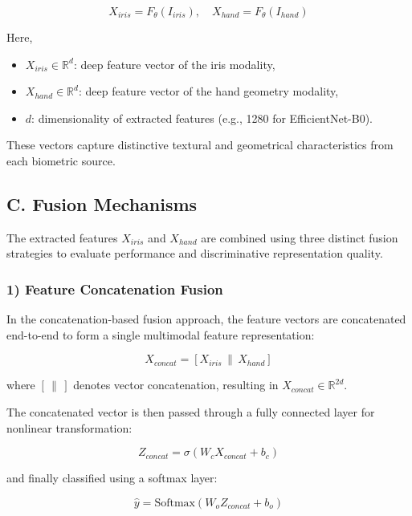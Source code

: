 \documentclass[12pt,a4paper]{report}
\begin{document}
\begin{equation}
X_{iris} = F_{\theta}(I_{iris}), \quad X_{hand} = F_{\theta}(I_{hand})
\end{equation}

Here,
\begin{itemize}
    \item \( X_{iris} \in \mathbb{R}^{d} \): deep feature vector of the iris modality,
    \item \( X_{hand} \in \mathbb{R}^{d} \): deep feature vector of the hand geometry modality,
    \item \( d \): dimensionality of extracted features (e.g., 1280 for EfficientNet-B0).
\end{itemize}

These vectors capture distinctive textural and geometrical characteristics from each biometric source.

\subsection*{C. Fusion Mechanisms}

The extracted features \( X_{iris} \) and \( X_{hand} \) are combined using three distinct fusion strategies to evaluate performance and discriminative representation quality.

\subsubsection*{1) Feature Concatenation Fusion}

In the concatenation-based fusion approach, the feature vectors are concatenated end-to-end to form a single multimodal feature representation:

\begin{equation}
X_{concat} = [X_{iris} \, \| \, X_{hand}]
\end{equation}

where \([\,\|\,]\) denotes vector concatenation, resulting in \( X_{concat} \in \mathbb{R}^{2d} \).

The concatenated vector is then passed through a fully connected layer for nonlinear transformation:

\begin{equation}
Z_{concat} = \sigma(W_c X_{concat} + b_c)
\end{equation}

and finally classified using a softmax layer:

\begin{equation}
\hat{y} = \text{Softmax}(W_o Z_{concat} + b_o)
\end{equation}
\end{document}
